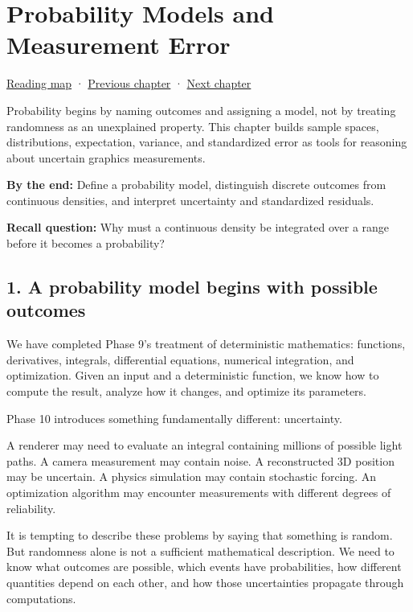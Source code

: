 \hypertarget{02-foundations-ii-ch023}{}
\chapter{Probability Models and Measurement Error}\label{02-foundations-ii-ch023-probability-models-and-measurement-error}

\hyperref[volume-reading-map]{Reading map} · \hyperref[02-foundations-ii-ch022-accumulation-quadrature-and-the-bridge-to-probability]{Previous chapter} · \hyperref[02-foundations-ii-ch024-waiting-times-covariance-and-matrix-decomposition]{Next chapter}

Probability begins by naming outcomes and assigning a model, not by treating randomness as an unexplained property. This chapter builds sample spaces, distributions, expectation, variance, and standardized error as tools for reasoning about uncertain graphics measurements.

\textbf{By the end:} Define a probability model, distinguish discrete outcomes from continuous densities, and interpret uncertainty and standardized residuals.

\textbf{Recall question:} Why must a continuous density be integrated over a range before it becomes a probability?

\section{1. A probability model begins with possible outcomes}\label{02-foundations-ii-ch023-a-probability-model-begins-with-possible-outcomes}

We have completed Phase 9's treatment of deterministic mathematics: functions, derivatives, integrals, differential equations, numerical integration, and optimization. Given an input and a deterministic function, we know how to compute the result, analyze how it changes, and optimize its parameters.

Phase 10 introduces something fundamentally different: uncertainty.

A renderer may need to evaluate an integral containing millions of possible light paths. A camera measurement may contain noise. A reconstructed 3D position may be uncertain. A physics simulation may contain stochastic forcing. An optimization algorithm may encounter measurements with different degrees of reliability.

It is tempting to describe these problems by saying that something is random. But randomness alone is not a sufficient mathematical description. We need to know what outcomes are possible, which events have probabilities, how different quantities depend on each other, and how those uncertainties propagate through computations.

